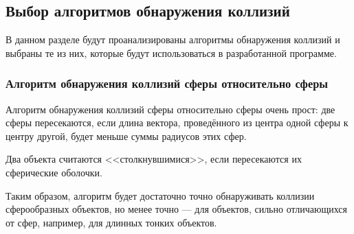 





\subsection{Выбор алгоритмов обнаружения коллизий}

В данном разделе будут проанализированы алгоритмы обнаружения коллизий и выбраны те из них, которые будут использоваться в разработанной программе.

\subsubsection{Алгоритм обнаружения коллизий сферы относительно сферы}

Алгоритм обнаружения коллизий сферы относительно сферы очень прост: две сферы пересекаются, если длина вектора, проведённого из центра одной сферы к центру другой, будет меньше суммы радиусов этих сфер. %

Два объекта считаются <<столкнувшимися>>, если пересекаются их сферические оболочки.

Таким образом, алгоритм будет достаточно точно обнаруживать коллизии сферообразных объектов, но менее точно --- для объектов, сильно отличающихся от сфер, например, для длинных тонких объектов.

